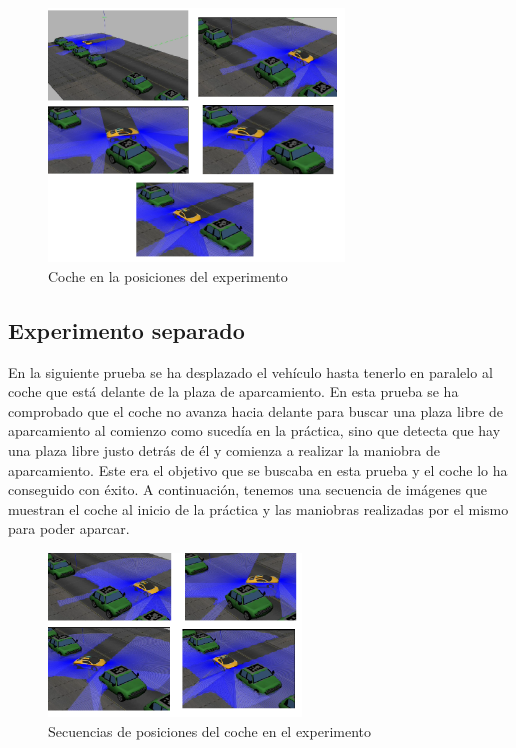 \begin{figure}[H]
  \begin{center}
    \includegraphics[width=0.7\textwidth]{figures/Autopark/Experimento1.png}
		\caption{Coche en la posiciones del experimento}
		\label{fig.Experimento1}
		\end{center}
\end{figure}


\subsection{Experimento separado}
En la siguiente prueba se ha desplazado el vehículo hasta tenerlo en paralelo al coche que está delante de la plaza de aparcamiento. En esta prueba se ha comprobado que el coche no avanza hacia delante para buscar una plaza libre de aparcamiento al comienzo como sucedía en la práctica, sino que detecta que hay una plaza libre justo detrás de él y comienza a realizar la maniobra de aparcamiento. Este era el objetivo que se buscaba en esta prueba y el coche lo ha conseguido con éxito. A continuación, tenemos una secuencia de imágenes que muestran el coche al inicio de la práctica y las maniobras realizadas por el mismo para poder aparcar.

\begin{figure}[H]
  \begin{center}
    \includegraphics[width=0.6\textwidth]{figures/Autopark/Experimento2.png}
		\caption{Secuencias de posiciones del coche en el experimento}
		\label{fig.Experimento2}
		\end{center}
\end{figure}
